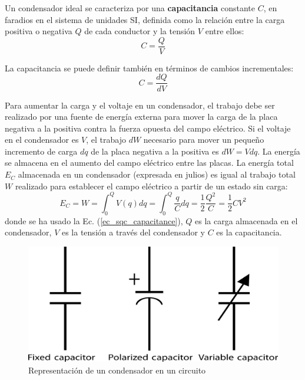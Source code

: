     Un condensador ideal se caracteriza por una \textbf{capacitancia} constante $C$, en faradios en el sistema de unidades SI, definida como la relación entre la carga positiva o negativa $Q$ de cada conductor y la tensión $V$ entre ellos:
    \begin{equation} \label{ec_sqc_capacitance}
        C = \frac{Q}{V}
    \end{equation}

    La capacitancia se puede definir también en términos de cambios incrementales:
    \begin{equation} \label{ec_sqc_d_capacitance}
        C = \frac{dQ}{dV}
    \end{equation}

    Para aumentar la carga y el voltaje en un condensador, el trabajo debe ser realizado por una fuente de energía externa para mover la carga de la placa negativa a la positiva contra la fuerza opuesta del campo eléctrico. Si el voltaje en el condensador es $V$, el trabajo $dW$ necesario para mover un pequeño incremento de carga $dq$ de la placa negativa a la positiva es $dW=Vdq$. La energía se almacena en el aumento del campo eléctrico entre las placas. La energía total $E_C$ almacenada en un condensador (expresada en julios) es igual al trabajo total $W$ realizado para establecer el campo eléctrico a partir de un estado sin carga:
    \begin{equation} \label{ec_sqc_capacitor_E}
        E_C = W = \int_0^Q V (q) dq = \int_0^Q \frac{q}{C} dq = \frac{1}{2} \frac{Q^2}{C} = \frac{1}{2} C V^2
    \end{equation}
    donde se ha usado la Ec. (\ref{ec_sqc_capacitance}), $Q$ es la carga almacenada en el condensador, $V$ es la tensión a través del condensador y $C$ es la capacitancia.

    \begin{figure}[h]
        \centering 
        \includegraphics[width=0.4\linewidth]{Figuras/Fig_Types_of_capacitor.png}
        \caption{Representación de un condensador en un circuito}
        \label{Fig_Types_of_capacitor.png}
    \end{figure}








